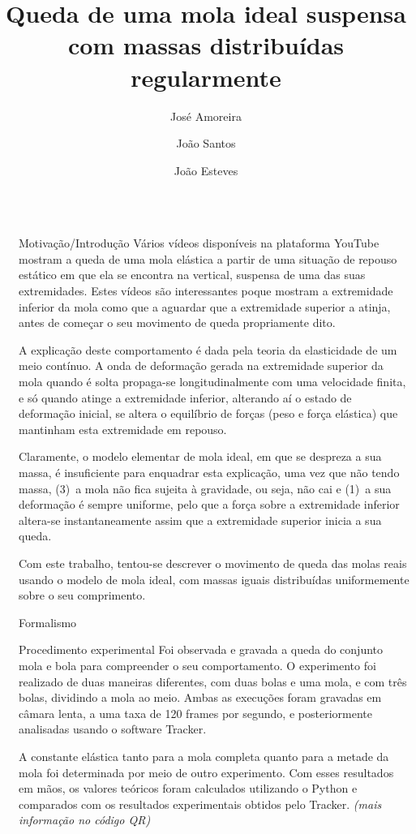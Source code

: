 \documentclass[final]{beamer}
\title{Queda de uma mola ideal suspensa com massas distribuídas regularmente}
\author{José Amoreira \inst{1,2,3} \and João Santos \inst{2} \and João Esteves \inst{2}}
\institute[]{\inst{1} Laboratório de Instrumentação e Física Experimental de Partículas \and  \inst{2}Universidade da Beira Interior  \samelineand \inst{3} Centro de Matemática e Aplicações}
\newlength{\sepwidth}
\newlength{\colwidth}
\newcommand{\separatorcolumn}{\begin{column}{\sepwidth}\end{column}}
\begin{document}
\begin{frame}[t]
\begin{columns}[t]
\separatorcolumn

\begin{column}{\colwidth}

  \begin{exampleblock}{Motivação/Introdução}
Vários vídeos disponíveis na plataforma YouTube mostram a queda de uma mola
elástica a partir de uma situação de repouso estático em que ela se encontra na
vertical, suspensa de uma das suas extremidades. Estes vídeos são interessantes
poque mostram a extremidade inferior da mola como que a aguardar que a
extremidade superior a atinja, antes de começar o seu movimento de queda
propriamente dito. 

A explicação deste comportamento é dada pela teoria da elasticidade de um meio
contínuo. A onda de deformação gerada na extremidade superior da mola quando é
solta propaga-se longitudinalmente com uma velocidade finita, e só quando atinge
a extremidade inferior, alterando aí o estado de deformação inicial, se altera o
equilíbrio de forças (peso e força elástica) que mantinham esta extremidade em
repouso.

Claramente, o modelo elementar de mola ideal, em que se despreza a sua massa, é
insuficiente para enquadrar esta explicação, uma vez que não tendo massa, (3)~a
mola não fica sujeita à gravidade, ou seja, não cai e (1)~a sua deformação é
sempre uniforme, pelo que a força sobre a extremidade inferior altera-se
instantaneamente assim que a extremidade superior inicia a sua queda. 

Com este trabalho, tentou-se descrever o movimento de queda das molas reais
usando o modelo de mola ideal, com massas iguais distribuídas uniformemente
sobre o seu comprimento.
  \end{exampleblock}
  

\begin{block}{Formalismo}
\vspace{1cm}

\end{block}

\begin{block}{Procedimento experimental}
   Foi observada e gravada a queda do conjunto mola e bola para compreender o seu comportamento. O experimento foi realizado de duas maneiras diferentes, com duas bolas e uma mola, e com três bolas, dividindo a mola ao meio. Ambas as execuções foram gravadas em câmara lenta, a uma taxa de 120 frames por segundo, e posteriormente analisadas usando o software Tracker.
    
 A constante elástica tanto para a mola completa quanto para a metade da mola foi determinada por meio de outro experimento. Com esses resultados em mãos, os valores teóricos foram calculados utilizando o Python e comparados com os resultados experimentais obtidos pelo Tracker. \emph{(mais informação no código QR)}
\end{block}


\end{column}
\end{columns}
\end{frame}
\end{document}
